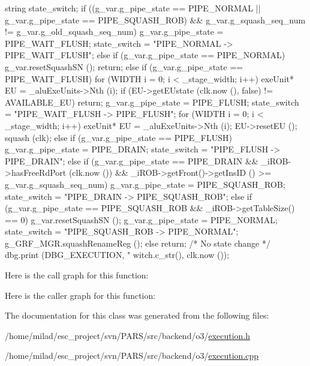 \begin{DoxyCode}
                                            {
    string state_switch;
    if ((g_var.g_pipe_state == PIPE_NORMAL || g_var.g_pipe_state == 
      PIPE_SQUASH_ROB) && 
        g_var.g_squash_seq_num != g_var.g_old_squash_seq_num) {
        g_var.g_pipe_state = PIPE_WAIT_FLUSH;
        state_switch =  "PIPE_NORMAL -> PIPE_WAIT_FLUSH";
    } else if (g_var.g_pipe_state == PIPE_NORMAL) {
        g_var.resetSquashSN ();
        return;
    } else if (g_var.g_pipe_state == PIPE_WAIT_FLUSH) {
        for (WIDTH i = 0; i < _stage_width; i++) {
            exeUnit* EU = _aluExeUnits->Nth (i);
            if (EU->getEUstate (clk.now (), false) != AVAILABLE_EU) return;
        }
        g_var.g_pipe_state = PIPE_FLUSH;
        state_switch =  "PIPE_WAIT_FLUSH -> PIPE_FLUSH";
        for (WIDTH i = 0; i < _stage_width; i++) {
            exeUnit* EU = _aluExeUnits->Nth (i);
            EU->resetEU ();
        }
        squash (clk);
    } else if (g_var.g_pipe_state == PIPE_FLUSH) {
        g_var.g_pipe_state = PIPE_DRAIN;
        state_switch =  "PIPE_FLUSH -> PIPE_DRAIN";
    } else if (g_var.g_pipe_state == PIPE_DRAIN && _iROB->hasFreeRdPort (clk.now 
      ()) && 
               _iROB->getFront()->getInsID () >= g_var.g_squash_seq_num) {
        g_var.g_pipe_state = PIPE_SQUASH_ROB;
        state_switch =  "PIPE_DRAIN -> PIPE_SQUASH_ROB";
    } else if (g_var.g_pipe_state == PIPE_SQUASH_ROB && _iROB->getTableSize() == 
      0) {
        g_var.resetSquashSN ();
        g_var.g_pipe_state = PIPE_NORMAL;
        state_switch =  "PIPE_SQUASH_ROB -> PIPE_NORMAL";
        g_GRF_MGR.squashRenameReg ();
    } else {
        return; /* No state change */
    }
    dbg.print (DBG_EXECUTION, "%
      witch.c_str(), clk.now ());
}
\end{DoxyCode}


Here is the call graph for this function:




Here is the caller graph for this function:




The documentation for this class was generated from the following files:\begin{DoxyCompactItemize}
\item 
/home/milad/esc\_\-project/svn/PARS/src/backend/o3/\hyperlink{o3_2execution_8h}{execution.h}\item 
/home/milad/esc\_\-project/svn/PARS/src/backend/o3/\hyperlink{o3_2execution_8cpp}{execution.cpp}\end{DoxyCompactItemize}
